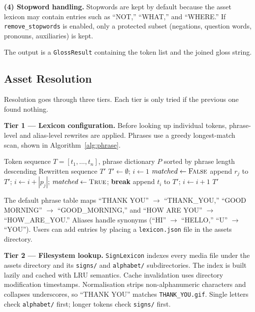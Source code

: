 \documentclass[conference]{IEEEtran}
\begin{document}
\textbf{(4) Stopword handling.} Stopwords are kept by default because the asset lexicon may contain entries such as ``NOT,'' ``WHAT,'' and ``WHERE.'' If \texttt{remove\_stopwords} is enabled, only a protected subset (negations, question words, pronouns, auxiliaries) is kept.

The output is a \texttt{GlossResult} containing the token list and the joined gloss string.

\subsection{Asset Resolution}

Resolution goes through three tiers. Each tier is only tried if the previous one found nothing.

\textbf{Tier 1 --- Lexicon configuration.} Before looking up individual tokens, phrase-level and alias-level rewrites are applied. Phrases use a greedy longest-match scan, shown in Algorithm~\ref{alg:phrase}.

\begin{algorithm}[t]
\caption{Greedy Phrase Mapping}
\label{alg:phrase}
\begin{algorithmic}[1]
\REQUIRE Token sequence $T = [t_1, \ldots, t_n]$, phrase dictionary $P$ sorted by phrase length descending
\ENSURE Rewritten sequence $T'$
\STATE $T' \gets \emptyset$; $i \gets 1$
    \STATE $matched \gets \textsc{False}$
            \STATE append $r_j$ to $T'$; $i \gets i + |p_j|$; $matched \gets \textsc{True}$; \textbf{break}
        \ENDIF
    \ENDFOR
     \STATE append $t_i$ to $T'$; $i \gets i + 1$ \ENDIF
\ENDWHILE
\RETURN $T'$
\end{algorithmic}
\end{algorithm}

The default phrase table maps ``THANK YOU'' $\rightarrow$ ``THANK\_YOU,'' ``GOOD MORNING'' $\rightarrow$ ``GOOD\_MORNING,'' and ``HOW ARE YOU'' $\rightarrow$ ``HOW\_ARE\_YOU.'' Aliases handle synonyms (``HI'' $\rightarrow$ ``HELLO,'' ``U'' $\rightarrow$ ``YOU''). Users can add entries by placing a \texttt{lexicon.json} file in the assets directory.

\textbf{Tier 2 --- Filesystem lookup.} \texttt{SignLexicon} indexes every media file under the assets directory and its \texttt{signs/} and \texttt{alphabet/} subdirectories. The index is built lazily and cached with LRU semantics. Cache invalidation uses directory modification timestamps. Normalisation strips non-alphanumeric characters and collapses underscores, so ``THANK YOU'' matches \texttt{THANK\_YOU.gif}. Single letters check \texttt{alphabet/} first; longer tokens check \texttt{signs/} first.
\end{document}
